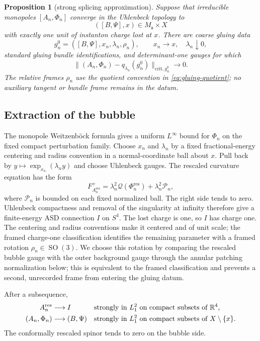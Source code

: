 \documentclass[11pt]{amsart}
\newtheorem{proposition}[theorem]{Proposition}
\theoremstyle{definition}
\theoremstyle{remark}
\theoremstyle{plain}
\newcommand{\RR}{\mathbb{R}}
\newcommand{\SO}{\operatorname{SO}}
\begin{document}
\begin{proposition}[strong splicing approximation]
\label{prop:strong-splicing}
Suppose that irreducible monopoles $[A_n,\Phi_n]$ converge in the Uhlenbeck
topology to
\[
 ([B,\Psi],x)\in M_{\mathfrak s}\times X
\]
with exactly one unit of instanton charge lost at $x$.  There are coarse
gluing data
\[
 g_n^0=([B,\Psi],x_n,\lambda_n,\rho_n),\qquad
 x_n\to x,\quad\lambda_n\downarrow0,
\]
standard gluing bundle identifications, and determinant-one gauges for which
\begin{equation}\label{eq:strong-splicing}
 \|(A_n,\Phi_n)-q_{\lambda_n}(g_n^0)\|_{\mathrm{crit},g_n^0}\longrightarrow0.
\end{equation}
The relative frames $\rho_n$ use the quotient convention in
\eqref{eq:gluing-quotient}; no auxiliary tangent or bundle frame remains in
the datum.
\end{proposition}

\subsection{Extraction of the bubble}
The monopole Weitzenb\"ock formula gives a uniform $L^\infty$ bound for
$\Phi_n$ on the fixed compact perturbation family.  Choose $x_n$ and
$\lambda_n$ by a fixed fractional-energy centering and radius convention in
a normal-coordinate ball about $x$.  Pull back by
$y\mapsto\exp_{x_n}(\lambda_n y)$ and choose Uhlenbeck gauges.  The rescaled
curvature equation has the form
\begin{equation}\label{eq:rescaled-curvature}
 F_{A_n^{\mathrm{res}}}^+
 =\lambda_n^2\mathcal Q(\Phi_n^{\mathrm{res}})
  +\lambda_n^2\mathcal P_n,
\end{equation}
where $\mathcal P_n$ is bounded on each fixed normalized ball.  The right
side tends to zero.  Uhlenbeck compactness and removal of the singularity at
infinity therefore give a finite-energy ASD connection $I$ on $S^4$.  The
lost charge is one, so $I$ has charge one.  The centering and radius
conventions make it centered and of unit scale; the framed charge-one
classification identifies the remaining parameter with a framed rotation
$\rho_n\in\SO(3)$.  We choose this rotation by comparing the rescaled bubble
gauge with the outer background gauge through the annular patching
normalization below; this is equivalent to the framed classification and
prevents a second, unrecorded frame from entering the gluing datum.

After a subsequence,
\begin{align}\label{eq:two-sided-strong-convergence}
 A_n^{\mathrm{res}}&\longrightarrow I
 &&\text{strongly in $L^2_1$ on compact subsets of $\RR^4$,}\notag\\
 (A_n,\Phi_n)&\longrightarrow(B,\Psi)
 &&\text{strongly in $L^2_1$ on compact subsets of $X\setminus\{x\}$.}
\end{align}
The conformally rescaled spinor tends to zero on the bubble side.
\end{document}
